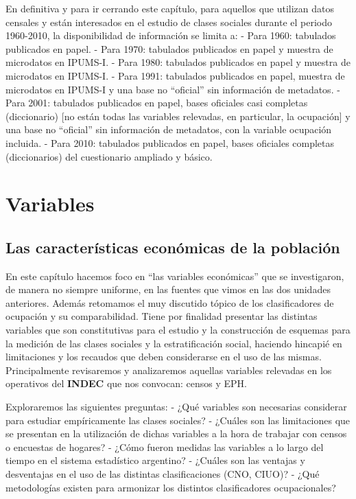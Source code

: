 \documentclass[
]{book}
\begin{document}
En definitiva y para ir cerrando este capítulo, para aquellos que utilizan datos censales y están interesados en el estudio de clases sociales durante el periodo 1960-2010, la disponibilidad de información se limita a:
- Para 1960: tabulados publicados en papel.
- Para 1970: tabulados publicados en papel y muestra de microdatos en IPUMS-I.
- Para 1980: tabulados publicados en papel y muestra de microdatos en IPUMS-I.
- Para 1991: tabulados publicados en papel, muestra de microdatos en IPUMS-I y una base no ``oficial'' sin información de metadatos.
- Para 2001: tabulados publicados en papel, bases oficiales casi completas (diccionario) {[}no están todas las variables relevadas, en particular, la ocupación{]} y una base no ``oficial'' sin información de metadatos, con la variable ocupación incluida.
- Para 2010: tabulados publicados en papel, bases oficiales completas (diccionarios) del cuestionario ampliado y básico.

\hypertarget{part-variables}{%
\part{Variables}\label{part-variables}}

\hypertarget{ocupacion}{%
\chapter{Las características económicas de la población}\label{ocupacion}}

En este capítulo hacemos foco en ``las variables económicas'' que se investigaron, de manera no siempre uniforme, en las fuentes que vimos en las dos unidades anteriores. Además retomamos el muy discutido tópico de los clasificadores de ocupación y su comparabilidad. Tiene por finalidad presentar las distintas variables que son constitutivas para el estudio y la construcción de esquemas para la medición de las clases sociales y la estratificación social, haciendo hincapié en limitaciones y los recaudos que deben considerarse en el uso de las mismas. Principalmente revisaremos y analizaremos aquellas variables relevadas en los operativos del \textbf{INDEC} que nos convocan: censos y EPH.

Exploraremos las siguientes preguntas:
- ¿Qué variables son necesarias considerar para estudiar empíricamente las clases sociales?
- ¿Cuáles son las limitaciones que se presentan en la utilización de dichas variables a la hora de trabajar con censos o encuestas de hogares?
- ¿Cómo fueron medidas las variables a lo largo del tiempo en el sistema estadístico argentino?
- ¿Cuáles son las ventajas y desventajas en el uso de las distintas clasificaciones (CNO, CIUO)?
- ¿Qué metodologías existen para armonizar los distintos clasificadores ocupacionales?
\end{document}
